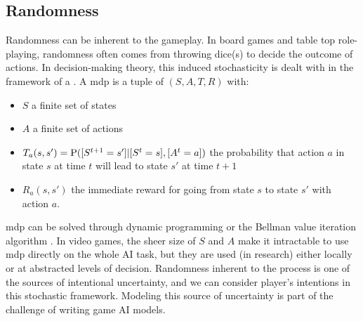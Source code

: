 
\subsection{Randomness}
Randomness can be inherent to the gameplay. In board games and table top role-playing, randomness often comes from throwing dice(s) to decide the outcome of actions. In decision-making theory, this induced stochasticity is dealt with in the framework of a . A \gls{mdp} is a tuple of $(S,A,T,R)$ with:
\begin{itemize}
    \item $S$ a finite set of states
    \item $A$ a finite set of actions
    \item $T_a(s,s') = \mathrm{P}([S^{t+1}=s']|[S^t=s],[A^t=a])$ the probability that action $a$ in state $s$ at time $t$ will lead to state $s'$ at time $t+1$
    \item $R_a(s,s')$ the immediate reward for going from state $s$ to state $s'$ with action $a$.
\end{itemize}
\gls{mdp} can be solved through dynamic programming or the Bellman value iteration algorithm \citep{Bellman}. In video games, the sheer size of $S$ and $A$ make it intractable to use \gls{mdp} directly on the whole AI task, but they are used (in research) either locally or at abstracted levels of decision. Randomness inherent to the process is one of the sources of intentional uncertainty, and we can consider player's intentions in this stochastic framework. Modeling this source of uncertainty is part of the challenge of writing game AI models.


